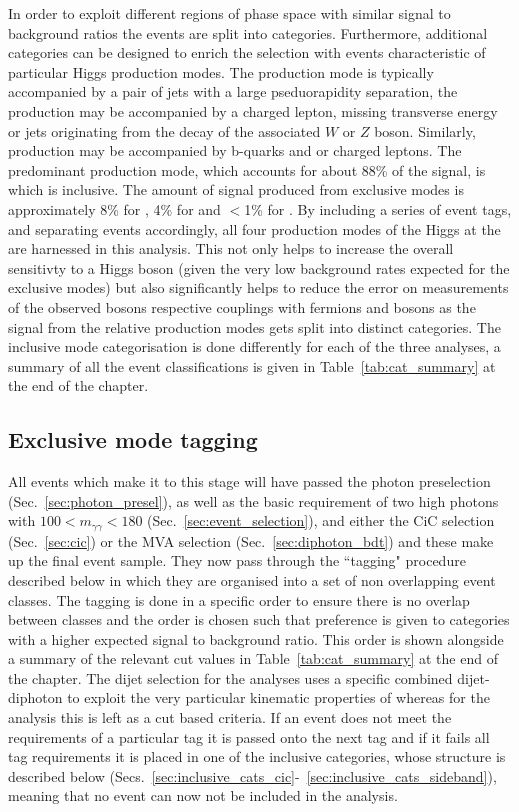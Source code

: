 In order to exploit different regions of phase space with similar signal to background ratios the events are split into categories. Furthermore, additional categories can be designed to enrich the selection with events characteristic of particular Higgs production modes. The \VBF production mode is typically accompanied by a pair of jets with a large pseduorapidity separation, the \VH production may be accompanied by a charged lepton, missing transverse energy or jets originating from the decay of the associated $W$ or $Z$ boson. Similarly, \ttH production may be accompanied by b-quarks and or charged leptons. The predominant production mode, which accounts for about 88\% of the signal, is \ggH which is inclusive. The amount of signal produced from exclusive modes is approximately 8\% for \VBF, 4\% for \VH and $<$1\% for \ttH. By including a series of event tags, and separating events accordingly, all four production modes of the Higgs at the \LHC are harnessed in this analysis. This not only helps to increase the overall sensitivty to a \SM Higgs boson (given the very low background rates expected for the exclusive modes) but also significantly helps to reduce the error on measurements of the observed bosons respective couplings with fermions and bosons as the signal from the relative production modes gets split into distinct categories. The inclusive mode categorisation is done differently for each of the three analyses, a summary of all the event classifications is given in Table~\ref{tab:cat_summary} at the end of the chapter.

\subsection{Exclusive mode tagging}
\label{sec:exclusive_tags}
All events which make it to this stage will have passed the photon preselection (Sec.~\ref{sec:photon_presel}), as well as the basic requirement of two high \pT photons with $100<m_{\gamma\gamma}<180$ (Sec.~\ref{sec:event_selection}), and either the CiC selection (Sec.~\ref{sec:cic}) or the MVA selection (Sec.~\ref{sec:diphoton_bdt}) and these make up the final event sample. They now pass through the ``tagging" procedure described below in which they are organised into a set of non overlapping event classes. The tagging is done in a specific order to ensure there is no overlap between classes and the order is chosen such that preference is given to categories with a higher expected signal to background ratio. This order is shown alongside a summary of the relevant cut values in Table~\ref{tab:cat_summary} at the end of the chapter. The dijet selection for the \MVA analyses uses a specific combined dijet-diphoton \BDT to exploit the very particular kinematic properties of \VBF whereas for the \CiC analysis this is left as a cut based criteria. If an event does not meet the requirements of a particular tag it is passed onto the next tag and if it fails all tag requirements it is placed in one of the inclusive categories, whose structure is described below (Secs.~\ref{sec:inclusive_cats_cic}-~\ref{sec:inclusive_cats_sideband}), meaning that no event can now not be included in the analysis. 

